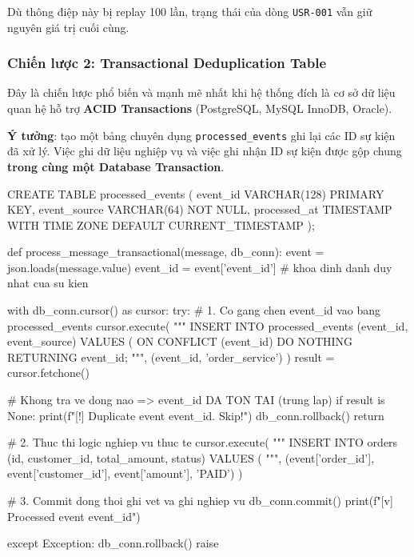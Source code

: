 \documentclass[12pt]{article}
\begin{document}
Dù thông điệp này bị replay 100 lần, trạng thái của dòng \texttt{USR-001} vẫn giữ nguyên giá trị cuối cùng.

\subsubsection{Chiến lược 2: Transactional Deduplication Table}

Đây là chiến lược phổ biến và mạnh mẽ nhất khi hệ thống đích là cơ sở dữ liệu quan hệ hỗ trợ \textbf{ACID Transactions} (PostgreSQL, MySQL InnoDB, Oracle).

\textbf{Ý tưởng}: tạo một bảng chuyên dụng \texttt{processed\_events} ghi lại các ID sự kiện đã xử lý. Việc ghi dữ liệu nghiệp vụ và việc ghi nhận ID sự kiện được gộp chung \textbf{trong cùng một Database Transaction}.

\begin{aivnsqlbox}
CREATE TABLE processed_events (
    event_id     VARCHAR(128) PRIMARY KEY,
    event_source VARCHAR(64) NOT NULL,
    processed_at TIMESTAMP WITH TIME ZONE DEFAULT CURRENT_TIMESTAMP
);
\end{aivnsqlbox}

\begin{aivnpybox}
def process_message_transactional(message, db_conn):
    event = json.loads(message.value)
    event_id = event['event_id']   # khoa dinh danh duy nhat cua su kien

    with db_conn.cursor() as cursor:
        try:
            # 1. Co gang chen event_id vao bang processed_events
            cursor.execute(
                """
                INSERT INTO processed_events (event_id, event_source)
                VALUES (%
                ON CONFLICT (event_id) DO NOTHING
                RETURNING event_id;
                """,
                (event_id, 'order_service')
            )
            result = cursor.fetchone()

            # Khong tra ve dong nao => event_id DA TON TAI (trung lap)
            if result is None:
                print(f"[!] Duplicate event {event_id}. Skip!")
                db_conn.rollback()
                return

            # 2. Thuc thi logic nghiep vu thuc te
            cursor.execute(
                """
                INSERT INTO orders (id, customer_id, total_amount, status)
                VALUES (%
                """,
                (event['order_id'], event['customer_id'], event['amount'], 'PAID')
            )

            # 3. Commit dong thoi ghi vet va ghi nghiep vu
            db_conn.commit()
            print(f"[v] Processed event {event_id}")

        except Exception:
            db_conn.rollback()
            raise
\end{aivnpybox}
\end{document}
